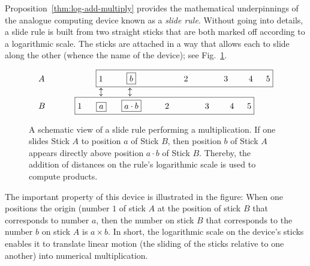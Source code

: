 Proposition~\ref{thm:log-add-multiply} provides the mathematical
underpinnings of the analogue computing device known as a {\it slide
  rule}.  Without going into details, a slide rule
is built from two straight sticks that are both marked off according
to a logarithmic scale.  The sticks are attached in a way that allows
each to slide along the other (whence the name of the device); see
Fig.~\ref{fig:slide-rule}.
\begin{figure}[htb]
\[
\begin{array}{ll}
A \hspace*{.35in} &
\hspace*{.35in}
\fbox{$1$ \hspace*{.3in} \fbox{$b$} 
\hspace*{.7in} $2$ 
\hspace*{.5in} $3$ 
\hspace*{.25in} $4$ 
\hspace*{.125in} $5$} \\ 
  &
\hspace*{.4in} \updownarrow \hspace*{.41in} \updownarrow \\
B \hspace*{.35in} &
\fbox{$1$\hspace*{.24in}\fbox{$a$}\hspace*{.25in}\fbox{$a \cdot b$}
\hspace*{.3in} $2$ 
\hspace*{.5in} $3$ 
\hspace*{.25in} $4$ 
\hspace*{.125in} $5$}
\end{array}
\]
\caption{A schematic view of a slide rule performing a multiplication.
  If one slides Stick $A$ to position $a$ of Stick $B$, then position
  $b$ of Stick $A$ appears directly above position $a \cdot b$ of
  Stick $B$.  Thereby, the addition of distances on the rule's
  logarithmic scale is used to compute products.}
\label{fig:slide-rule}
\end{figure}
The important property of this device is illustrated in the figure:
When one positions the origin (number $1$ of stick $A$ at the position
of stick $B$ that corresponds to number $a$, then the number on stick
$B$ that corresponds to the number $b$ on stick $A$ is $a \times b$.
In short, the logarithmic scale on the device's sticks enables it to
translate linear motion (the sliding of the sticks relative to one
another) into numerical multiplication.

